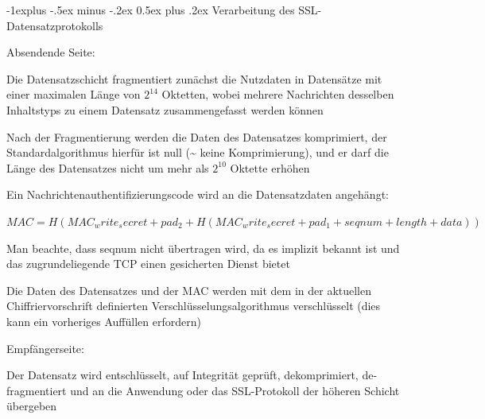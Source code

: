 \documentclass[a4paper]{article}
\makeatletter
\renewcommand{\subsection}{\@startsection{subsection}{2}{0mm}%
 {-1explus -.5ex minus -.2ex}%
 {0.5ex plus .2ex}%
 {\normalfont\normalsize\bfseries}}
\makeatother
\begin{document}
\begin{multicols}{3}
\begin{itemize*}
            \subsection{Verarbeitung des
                  SSL-Datensatzprotokolls}
            \begin{itemize*}
                  \item Absendende Seite:
                  \begin{itemize*}
                        \item Die Datensatzschicht fragmentiert zunächst die Nutzdaten in Datensätze mit einer maximalen Länge von $2^{14}$ Oktetten, wobei mehrere Nachrichten desselben Inhaltstyps zu einem Datensatz zusammengefasst werden können
                        \item Nach der Fragmentierung werden die Daten des Datensatzes komprimiert, der Standardalgorithmus hierfür ist null (\textasciitilde{} keine Komprimierung), und er darf die Länge des Datensatzes nicht um mehr als $2^{10}$ Oktette erhöhen
                        \item Ein Nachrichtenauthentifizierungscode wird an die Datensatzdaten angehängt:
                        \begin{itemize*} \item $MAC = H(MAC_write_secret + pad_2 + H(MAC_write_secret + pad_1 + seqnum + length + data))$ \item Man beachte, dass seqnum nicht übertragen wird, da es implizit bekannt ist und das zugrundeliegende TCP einen gesicherten Dienst bietet \end{itemize*}
                        \item Die Daten des Datensatzes und der MAC werden mit dem in der aktuellen Chiffriervorschrift definierten Verschlüsselungsalgorithmus verschlüsselt (dies kann ein vorheriges Auffüllen erfordern)
                  \end{itemize*}
                  \item Empfängerseite:
                  \begin{itemize*}
                        \item Der Datensatz wird entschlüsselt, auf Integrität geprüft, dekomprimiert, de-fragmentiert und an die Anwendung oder das SSL-Protokoll der höheren Schicht übergeben
                  \end{itemize*}
            \end{itemize*}


\end{itemize*}
\end{multicols}
\end{document}
